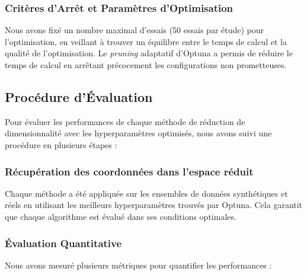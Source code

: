 \documentclass[unnumsec,webpdf,modern,large]{projet_manifold}%
\theoremstyle{thmstyleone}%
\theoremstyle{thmstyletwo}%
\theoremstyle{thmstylethree}%
\begin{document}
\subsubsection{Critères d'Arrêt et Paramètres d'Optimisation}

Nous avons fixé un nombre maximal d'essais (50 essais par étude) pour l'optimisation, en veillant à trouver un équilibre entre le temps de calcul et la qualité de l'optimisation. Le \textit{pruning} adaptatif d'Optuna a permis de réduire le temps de calcul en arrêtant précocement les configurations non prometteuses.

\subsection{Procédure d'Évaluation}

Pour évaluer les performances de chaque méthode de réduction de dimensionnalité avec les hyperparamètres optimisés, nous avons suivi une procédure en plusieurs étapes :

\subsubsection{Récupération des coordonnées dans l'espace réduit}

Chaque méthode a été appliquée sur les ensembles de données synthétiques et réels en utilisant les meilleurs hyperparamètres trouvés par Optuna. Cela garantit que chaque algorithme est évalué dans ses conditions optimales.

\subsubsection{Évaluation Quantitative}

Nous avons mesuré plusieurs métriques pour quantifier les performances :
\end{document}
